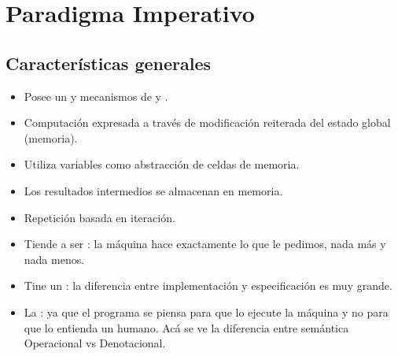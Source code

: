 \section{Paradigma Imperativo}

\subsection{Características generales}

\begin{itemize}
  \item Posee un  y mecanismos de  y .
  \item Computación expresada a través de modificación reiterada del estado global (memoria).
  \item Utiliza variables como abstracción de celdas de memoria.
  \item Los resultados intermedios se almacenan en memoria.
  \item Repetición basada en iteración.
  \item Tiende a ser : la máquina hace exactamente lo que le pedimos, nada más y nada menos.
  \item Tine un : la diferencia entre implementación y especificación es muy grande.
  \item La : ya que el programa se piensa para que lo ejecute la máquina y no para que lo entienda un humano. Acá se ve la diferencia entre semántica Operacional vs Denotacional.
\end{itemize}
